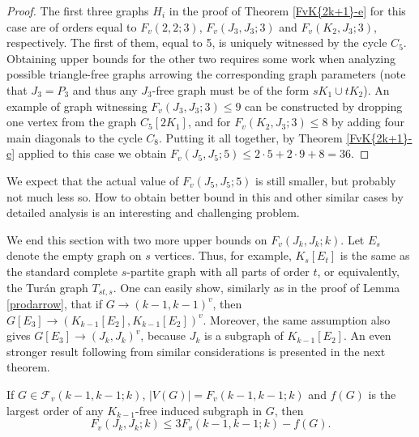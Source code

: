 \begin{proof}
The first three graphs $H_i$ in the proof
of Theorem \ref{FvK{2k+1}-e}
for this case are of orders equal to
$F_v(2,2;3)$, $F_v(J_3,J_3;3)$ and
$F_v(K_2,J_3;3)$, respectively. The first of them,
equal to 5, is uniquely witnessed by the cycle
$C_5$. Obtaining upper bounds for the other two
requires some work when analyzing
possible triangle-free graphs arrowing
the corresponding graph parameters
(note that $J_3=P_3$ and thus
any $J_3$-free graph
must be of the form $sK_1 \cup tK_2$).
An example of graph witnessing
$F_v(J_3,J_3;3) \le 9$ can be constructed 
by dropping one vertex from the graph
$C_5[2K_1]$, and for $F_v(K_2,J_3;3) \le 8$
by adding four main diagonals
to the cycle $C_8$. Putting it all together,
by Theorem \ref{FvK{2k+1}-e} applied to this case we obtain
$F_v(J_5,J_5;5) \le 2\cdot 5+2 \cdot 9+8=36$.
\end{proof}

We expect that the actual value of $F_v(J_5,J_5;5)$
is still smaller, but probably not much less so.
How to obtain better bound in this and other similar
cases by detailed analysis is an interesting and
challenging problem.

\medskip
We end this section with two more
upper bounds on $F_v(J_k,J_k;k)$.
Let $E_s$ denote the empty graph on $s$ vertices.
Thus, for example, $K_s[E_t]$ is the same as
the standard complete
$s$-partite graph with all parts of order $t$,
or equivalently, the Tur\'{a}n graph $T_{st,s}$.
One can easily show, similarly as in the proof
of Lemma \ref{prodarrow},
that if $G \rightarrow (k-1,k-1)^v$, then
$G[E_3] \rightarrow (K_{k-1}[E_2],K_{k-1}[E_2])^v$.
Moreover, the same assumption also gives
$G[E_3] \rightarrow (J_k,J_k)^v$,
because $J_k$ is a subgraph of $K_{k-1}[E_2]$.
An even stronger result following from similar
considerations is presented in the next theorem.

\medskip
\begin{theorem} \label{FvKk-e}
If $G \in \mathcal{F}_v(k-1,k-1;k)$,
$|V(G)| = F_v(k-1,k-1;k)$ and $f(G)$
is the largest order of any $K_{k-1}$-free induced
subgraph in $G$, then
$$F_v(J_k,J_k;k) \leq 3 F_v(k-1,k-1;k) - f(G).$$
\end{theorem}

